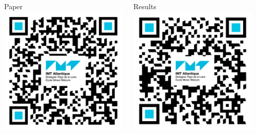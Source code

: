 \documentclass[color,t,presentation,english,aspectratio=169]{beamer}
\begin{document}
\begin{frame}
	\begin{columns}
		\hfil\hfil
		\begin{column}{.25\textwidth}
			\centering
			\small Paper\\
			\includegraphics[width=.8\linewidth]{figures/qr-paper.png}
		\end{column}
		\hfil
		\begin{column}{.25\textwidth}
			\centering
			\small Results\\
			\includegraphics[width=.8\linewidth]{figures/qr-results.png}
		\end{column}
		\hfil\hfil
		\begin{column}{.25\textwidth}

\end{column}
\end{columns}
\end{frame}
\end{document}
